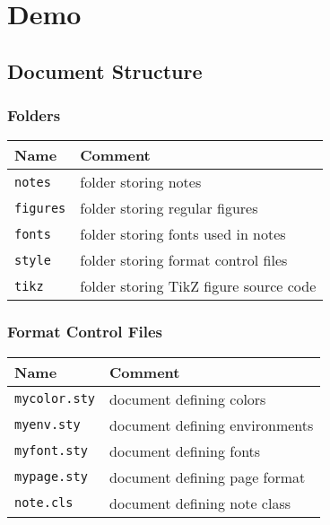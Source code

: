 \chapter{Demo}

\section{Document Structure}

\subsection{Folders}
\begin{mytable}
    \begin{tabular}{ll}
        \textbf{Name} & \textbf{Comment} \\
        \hline
        \texttt{notes}       & folder storing notes \\
        \texttt{figures}     & folder storing regular figures \\
        \texttt{fonts}       & folder storing fonts used in notes \\
        \texttt{style}       & folder storing format control files \\
        \texttt{tikz}        & folder storing TikZ figure source code
    \end{tabular}
\end{mytable}



\subsection{Format Control Files}
\begin{mytable}
    \begin{tabular}{ll}
        \textbf{Name} & \textbf{Comment} \\
        \hline
        \texttt{mycolor.sty} & document defining colors \\
        \texttt{myenv.sty}   & document defining environments \\
        \texttt{myfont.sty}  & document defining fonts \\
        \texttt{mypage.sty}  & document defining page format \\
        \texttt{note.cls}    & document defining note class
    \end{tabular}
\end{mytable}


